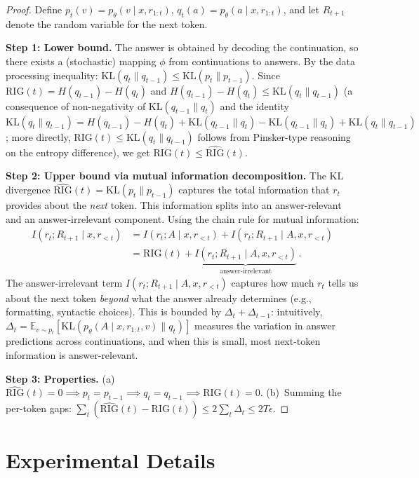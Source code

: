 \documentclass{article}
\newcommand{\E}{\mathbb{E}}
\newcommand{\RIG}{\mathrm{RIG}}
\newcommand{\KL}{\mathrm{KL}}
\begin{document}
\begin{proof}
Define $p_t(v) = p_\theta(v \mid x, r_{1:t})$, $q_t(a) = p_\theta(a \mid x, r_{1:t})$, and let $R_{t+1}$ denote the random variable for the next token.

\textbf{Step 1: Lower bound.} The answer is obtained by decoding the continuation, so there exists a (stochastic) mapping $\phi$ from continuations to answers. By the data processing inequality: $\KL(q_t \| q_{t-1}) \leq \KL(p_t \| p_{t-1})$. Since $\RIG(t) = H(q_{t-1}) - H(q_t)$ and $H(q_{t-1}) - H(q_t) \leq \KL(q_t \| q_{t-1})$ (a consequence of non-negativity of $\KL(q_{t-1} \| q_t)$ and the identity $\KL(q_t \| q_{t-1}) = H(q_{t-1}) - H(q_t) + \KL(q_{t-1} \| q_t) - \KL(q_{t-1} \| q_t) + \KL(q_t \| q_{t-1})$; more directly, $\RIG(t) \leq \KL(q_t \| q_{t-1})$ follows from Pinsker-type reasoning on the entropy difference), we get $\RIG(t) \leq \widehat{\RIG}(t)$.

\textbf{Step 2: Upper bound via mutual information decomposition.}
The KL divergence $\widehat{\RIG}(t) = \KL(p_t \| p_{t-1})$ captures the total information that $r_t$ provides about the \emph{next} token. This information splits into an answer-relevant and an answer-irrelevant component. Using the chain rule for mutual information:
\begin{align}
    I(r_t; R_{t+1} \mid x, r_{<t}) &= I(r_t; A \mid x, r_{<t}) + I(r_t; R_{t+1} \mid A, x, r_{<t}) \nonumber \\
    &= \RIG(t) + \underbrace{I(r_t; R_{t+1} \mid A, x, r_{<t})}_{\text{answer-irrelevant}}\,.
\end{align}
The answer-irrelevant term $I(r_t; R_{t+1} \mid A, x, r_{<t})$ captures how much $r_t$ tells us about the next token \emph{beyond} what the answer already determines (e.g., formatting, syntactic choices). This is bounded by $\Delta_t + \Delta_{t-1}$: intuitively, $\Delta_t = \E_{v \sim p_t}[\KL(p_\theta(A \mid x, r_{1:t}, v) \| q_t)]$ measures the variation in answer predictions across continuations, and when this is small, most next-token information is answer-relevant.

\textbf{Step 3: Properties.} (a)~$\widehat{\RIG}(t) = 0 \implies p_t = p_{t-1} \implies q_t = q_{t-1} \implies \RIG(t) = 0$. (b)~Summing the per-token gaps: $\sum_t (\widehat{\RIG}(t) - \RIG(t)) \leq 2\sum_t \Delta_t \leq 2T\epsilon$.
\end{proof}

\section{Experimental Details}
\label{app:details}
\end{document}
